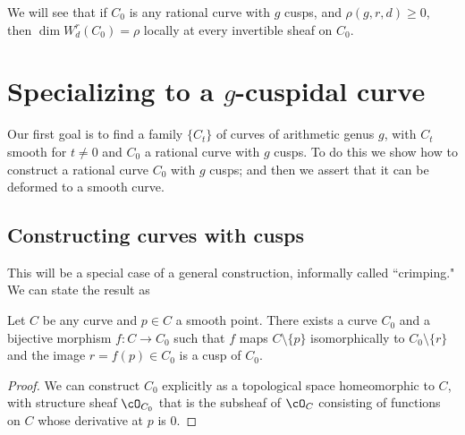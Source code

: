  We will see that if $C_{0}$ is any rational curve
 with $g$ cusps, and $\rho(g,r,d)\geq 0$, then $\dim W^r_d(C_0) = \rho$ locally at every invertible sheaf
 on $C_{0}$.
 





\section{Specializing to a $g$-cuspidal curve}

Our first goal is to find a family $\{C_t\}$ of curves of arithmetic genus $g$, with $C_t$ smooth for $t \neq 0$ and $C_0$ a rational curve with $g$ cusps. To do this we show how to construct a rational curve $C_0$ with $g$ cusps; and then we assert that it can be deformed to a smooth curve.

\subsection{Constructing curves with cusps}

This will be a special case of a general construction, informally called ``crimping." We can state the result as

\begin{proposition}
Let $C$ be any curve and $p \in C$ a smooth point. There exists a curve $C_0$ and a bijective morphism $f : C \to C_0$ such that  $f$ maps $C \setminus \{p\}$ isomorphically to $C_0 \setminus \{r\}$ and the image $r=f(p) \in C_0$ is a cusp of $C_0$.
\end{proposition}


\begin{proof}
We can construct $C_0$ explicitly as a topological space homeomorphic to $C$, with structure sheaf $\cO_{C_0}$ that is
the subsheaf of $\cO_C$ consisting of functions on $C$ whose derivative at $p$ is 0.
\end{proof}

